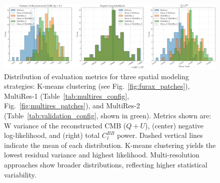 \documentclass[fleqn,usenatbib]{mnras}
\begin{document}
\begin{figure}
    \centering
    \includegraphics[width=1\linewidth]{figures/variance_likelihood_distributions.pdf}
    \caption{
    Distribution of evaluation metrics for three spatial modeling strategies: K-means clustering (see Fig.~\protect\ref{fig:furax_patches}), MultiRes-1 (Table~\protect\ref{tab:multires_config}, Fig.~\protect\ref{fig:multires_patches}), and MultiRes-2 (Table~\protect\ref{tab:validation_config}, shown in green). 
    Metrics shown are: W variance of the reconstructed CMB ($Q + U$), (center) negative log-likelihood, and (right) total $C_\ell^{BB}$ power. 
    Dashed vertical lines indicate the mean of each distribution. 
    K-means clustering yields the lowest residual variance and highest likelihood. 
    Multi-resolution approaches show broader distributions, reflecting higher statistical variability.
    }


    \label{fig:metric_distributions}
\end{figure}

\vspace{-1em}
\end{document}
